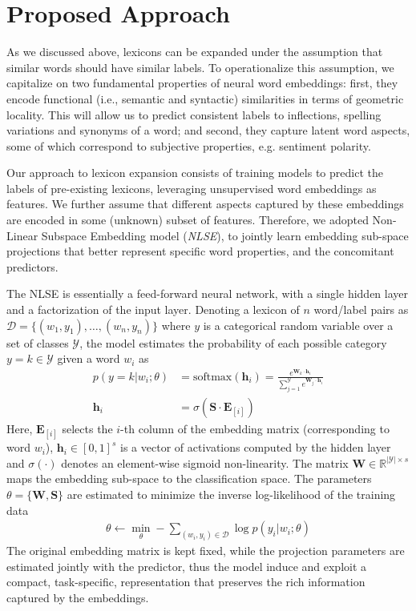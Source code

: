 \documentclass[letterpaper]{article}
\newcommand{\newcite}[1]{\citeauthor{#1} \shortcite{#1}}
\begin{document}
\section{Proposed Approach}

As we discussed above, lexicons can be expanded under the assumption that similar words should have similar labels. To operationalize this assumption, we capitalize on two fundamental properties of neural word embeddings: first, they encode functional (i.e., semantic and syntactic) similarities in terms of geometric locality. This will allow us to predict consistent labels to inflections, spelling variations and synonyms of a word; and second, they capture latent word aspects, some of which correspond to subjective properties, e.g. sentiment polarity.

Our approach to lexicon expansion consists of training models to predict the labels of pre-existing lexicons, leveraging unsupervised word embeddings as features. We further assume that different aspects captured by these embeddings are encoded in some (unknown) subset of features. Therefore, we adopted \newcite{astudillo-EtAl:2015:ACL-IJCNLP} Non-Linear Subspace Embedding model (\textsl{NLSE}), to jointly learn embedding sub-space projections that better represent specific word properties, and the concomitant predictors. 

The NLSE is essentially a feed-forward neural network, with a single hidden layer and a factorization of the input layer. Denoting a lexicon of $n$ word/label pairs as ${\mathcal{D} = \{(w_1,y_1),\dots ,(w_n,y_n)\}}$ where $y$ is a categorical random variable over a set of classes $\mathcal{Y}$, the model estimates the probability of each possible category $y=k \in \mathcal{Y}$ given a word $w_i$ as
\begin{align}
p(y=k| w_i;\theta) &= \mathrm{softmax}(\mathbf{h}_i) =\frac{e^{\mathbf{W}_k \cdot \mathbf{h}_i}}{\sum_{j=1}^{\mathcal{Y}}{e^{\mathbf{W}_j \cdot \mathbf{h}_i}}}\label{eq:nlse}\\
\nonumber \mathbf{h}_i &= \sigma\left(\mathbf{S}\cdot \mathbf{E}_{[i]} \right)
\end{align}
Here, $\mathbf{E}_{[i]}$ selects the $i$-th column of the embedding matrix (corresponding to word $w_i$), $\mathbf{h}_i \in [0, 1]^{s}$ is a vector of activations computed by the hidden layer and $\sigma(\cdot)$ denotes an element-wise sigmoid non-linearity. The matrix $\mathbf{W} \in \mathbb{R}^{|\mathcal{Y}| \times s}$ maps the embedding sub-space to the classification space. The parameters $\theta=\{\mathbf{W,S}\}$ are estimated to minimize the inverse log-likelihood of the training data
\begin{align}
\theta \leftarrow \underset{\theta}{\min} - \sum_{(w_i,y_i) \in \mathcal{D}} \log p(y_i|w_i;\theta)
\label{eq:nlse_loss}
\end{align}
The original embedding matrix is kept fixed, while the projection parameters are estimated jointly with the predictor, thus the model induce and exploit a compact, task-specific, representation that preserves the rich information captured by the embeddings.
\end{document}
